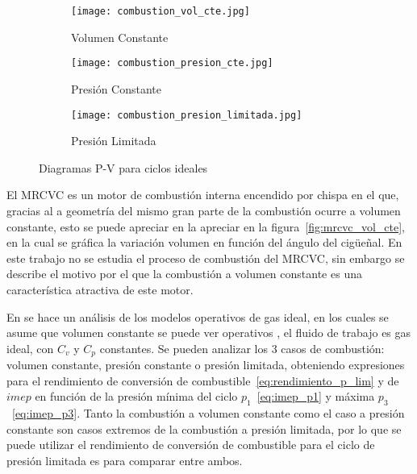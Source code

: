 \begin{figure}[ht]
  \centering
  \begin{subfigure}{0.33\textwidth}
    \centering
    \texttt{[image: combustion\_vol\_cte.jpg]}
    \caption{Volumen Constante}\label{fig:comb_vcte}
  \end{subfigure}%
  \begin{subfigure}{0.33\textwidth}
    \centering
    \texttt{[image: combustion\_presion\_cte.jpg]}
    \caption{Presión Constante}\label{fig:comb_pcte}
  \end{subfigure}%
  \begin{subfigure}{0.4\textwidth}
    \centering
    \texttt{[image: combustion\_presion\_limitada.jpg]}
    \caption{Presión Limitada}\label{fig:comb_plim}
  \end{subfigure}
  \caption{Diagramas P-V para ciclos ideales\parencite{heywood}}\label{fig:ciclos_ideales}
\end{figure}

El MRCVC es un motor de combustión interna encendido por chispa en el que,
gracias al a geometría del mismo gran parte de la combustión ocurre a volumen
constante, esto se puede apreciar en la apreciar en la
figura~\ref{fig:mrcvc_vol_cte}, en la cual se gráfica la variación volumen en
función del ángulo del cigüeñal.
%
En este trabajo no se estudia el proceso de combustión del MRCVC, sin embargo se
describe el motivo por el que la combustión a volumen constante es una
característica atractiva de este motor.
%

En \parencite{heywood} se hace un análisis de los modelos operativos de gas
ideal, en los cuales se asume que %
volumen constante se puede ver %
operativos \parencite{heywood}, el fluido de trabajo es gas ideal, con $C_v$ y
$C_p$ constantes.
%
Se pueden analizar los 3 casos de combustión: volumen constante, presión
constante o presión limitada, obteniendo expresiones para el rendimiento de
conversión de combustible~\ref{eq:rendimiento_p_lim} y de $imep$ en función de
la presión mínima del ciclo $p_1$~\ref{eq:imep_p1} y máxima
$p_3$~\ref{eq:imep_p3}.
%
Tanto la combustión a volumen constante como el caso a presión constante son
casos extremos de la combustión a presión limitada, por lo que se puede utilizar
el rendimiento de conversión de combustible para el ciclo de presión limitada es
para comparar entre ambos.

